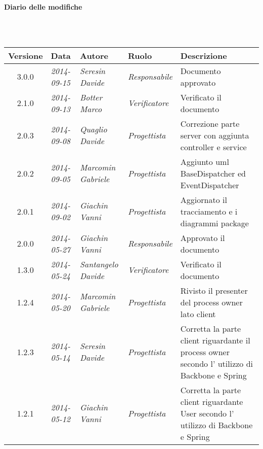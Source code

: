\noindent\begin{Large}\textbf{Diario delle modifiche}\end{Large}\\
\\
\begin{small}
\begin{tabular}{|c|p{1.8cm}|p{2.8cm}|p{2.8cm}|p{3.5cm}|}
\hline
Versione & Data & Autore & Ruolo & Descrizione \\
\hline
\hline
3.0.0 & \textit{2014-09-15} & 
\textit{Seresin Davide} &
\textit{Responsabile} & Documento approvato\\
\hline
2.1.0 & \textit{2014-09-13} & 
\textit{Botter Marco} &
\textit{Verificatore} & Verificato il documento\\
\hline
2.0.3 & \textit{2014-09-08} & 
\textit{Quaglio Davide} &
\textit{Progettista} & Correzione parte server con aggiunta controller e service\\
\hline
2.0.2 & \textit{2014-09-05} & 
\textit{Marcomin Gabriele} &
\textit{Progettista} & Aggiunto uml BaseDispatcher ed EventDispatcher\\
\hline
2.0.1 & \textit{2014-09-02} & 
\textit{Giachin Vanni} &
\textit{Progettista} & Aggiornato il tracciamento e i diagrammi package\\
\hline
2.0.0 & \textit{2014-05-27} & 
\textit{Giachin Vanni} &
\textit{Responsabile} & Approvato il documento\\
\hline
1.3.0 & \textit{2014-05-24} & 
\textit{Santangelo Davide} &
\textit{Verificatore} & Verificato il documento\\
\hline
1.2.4 & \textit{2014-05-20} & 
\textit{Marcomin Gabriele} &
\textit{Progettista} & Rivisto il presenter del process owner lato client\\
\hline
1.2.3 & \textit{2014-05-14} & 
\textit{Seresin Davide} &
\textit{Progettista} & Corretta la parte client riguardante il process owner secondo l' utilizzo di Backbone e Spring\\
\hline
1.2.1 & \textit{2014-05-12} & 
\textit{Giachin Vanni} &
\textit{Progettista} & Corretta la parte client riguardante User secondo l' utilizzo di Backbone e Spring\\
\hline
\end{tabular}


\end{small}
